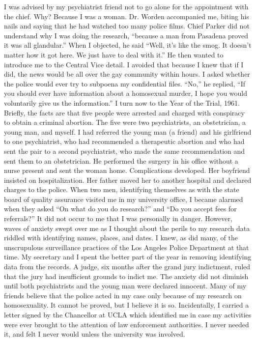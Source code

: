 I was advised by my psychiatrist friend not to go alone for the appointment with the chief. Why? Because I was a woman. Dr. Worden accompanied me, biting his nails and saying that he had watched too many police films. Chief Parker did not understand why I was doing the research, ``because a man from Pasadena proved it was all glandular.'' When I objected, he said ``Well, it's like the smog. It doesn't matter how it got here. We just have to deal with it.'' He then wanted to introduce me to the Central Vice detail. I avoided that because I knew that if I did, the news would be all over the gay community within hours. I asked whether the police would ever try to subpoena my confidential files. ``No,'' he replied, ``If you should ever have information about a homosexual murder, I hope you would voluntarily give us the information.''
I turn now to the Year of the Trial, 1961. Briefly, the facts are that five people were arrested and charged with conspiracy to obtain a criminal abortion. The five were two psychiatrists, an obstetrician, a young man, and myself. I had referred the young man (a friend) and his girlfriend to one psychiatrist, who had recommended a therapeutic abortion and who had sent the pair to a second psychiatrist, who made the same recommendation and sent them to an obstetrician. He performed the surgery in his office without a nurse present and sent the woman home. Complications developed. Her boyfriend insisted on hospitalization. Her father moved her to another hospital and declared charges to the police.
When two men, identifying themselves as with the state board of quality assurance visited me in my university office, I became alarmed when they asked ``On what do you do research?'' and ``Do you accept fees for referrals?'' It did not occur to me that I was personally in danger. However, waves of anxiety swept over me as I thought about the perils to my research data riddled with identifying names, places, and dates. I knew, as did many, of the unscrupulous surveillance practices of the Los Angeles Police Department at that time. My secretary and I spent the better part of the year in removing identifying data from the records. A judge, six months after the grand jury indictment, ruled that the jury had insufficient grounds to indict me. The anxiety did not diminish until both psychiatrists and the young man were declared innocent. Many of my friends believe that the police acted in my case only because of my research on homosexuality. It cannot be proved, but I believe it is so.
Incidentally, I carried a letter signed by the Chancellor at UCLA which identified me in case my activities were ever brought to the attention of law enforcement authorities. I never needed it, and felt I never would unless the university was involved.
